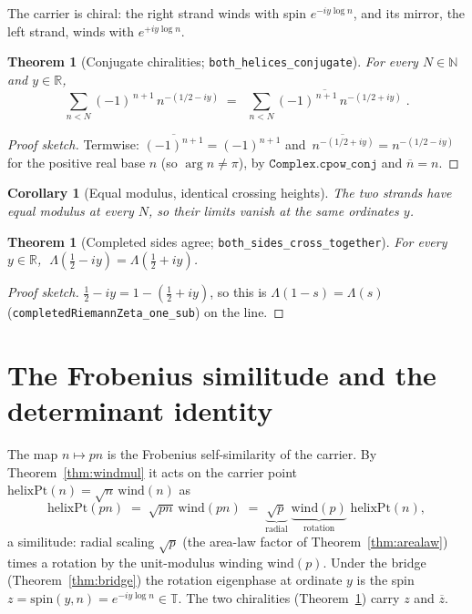 \documentclass[11pt]{article}
\newtheorem{theorem}[definition]{Theorem}
\newtheorem{corollary}[definition]{Corollary}
\DeclareMathOperator{\arglocal}{arg}
\newcommand{\R}{\mathbb{R}}
\newcommand{\N}{\mathbb{N}}
\newcommand{\T}{\mathbb{T}}
\newcommand{\conj}[1]{\overline{#1}}
\newcommand{\code}[1]{\texttt{#1}}
\begin{document}
The carrier is chiral: the right strand winds with spin $e^{-iy\log n}$, and its mirror, the left
strand, winds with $e^{+iy\log n}$.

\begin{theorem}[Conjugate chiralities; \code{both\_helices\_conjugate}]\label{thm:conjhelix}
For every $N\in\N$ and $y\in\R$,
\[
  \sum_{n<N}(-1)^{\,n+1}\,n^{-(1/2-iy)}
   \;=\; \conj{\;\sum_{n<N}(-1)^{\,n+1}\,n^{-(1/2+iy)}\;}.
\]
\end{theorem}

\begin{proof}[Proof sketch]
Termwise: $\conj{(-1)^{n+1}}=(-1)^{n+1}$ and $\conj{\,n^{-(1/2+iy)}}=n^{-(1/2-iy)}$ for the positive
real base $n$ (so $\arglocal n\neq\pi$), by $\code{Complex.cpow\_conj}$ and $\conj n=n$.
\end{proof}

\begin{corollary}[Equal modulus, identical crossing heights]\label{cor:equalmod}
The two strands have equal modulus at every $N$, so their limits vanish at the same ordinates $y$.
\end{corollary}

\begin{theorem}[Completed sides agree; \code{both\_sides\_cross\_together}]\label{thm:bothsides}
For every $y\in\R$, $\;\Lambda(\tfrac12-iy)=\Lambda(\tfrac12+iy)$.
\end{theorem}

\begin{proof}[Proof sketch]
$\tfrac12-iy=1-(\tfrac12+iy)$, so this is $\Lambda(1-s)=\Lambda(s)$
(\code{completedRiemannZeta\_one\_sub}) on the line.
\end{proof}

\section{The Frobenius similitude and the determinant identity}\label{sec:det}

The map $n\mapsto pn$ is the Frobenius self-similarity of the carrier. By Theorem~\ref{thm:windmul}
it acts on the carrier point $\mathrm{helixPt}(n)=\sqrt n\,\mathrm{wind}(n)$ as
\[
  \mathrm{helixPt}(pn) \;=\; \sqrt{pn}\,\mathrm{wind}(pn)
   \;=\; \underbrace{\sqrt p}_{\text{radial}}\;\underbrace{\mathrm{wind}(p)}_{\text{rotation}}\;\mathrm{helixPt}(n),
\]
a similitude: radial scaling $\sqrt p$ (the area-law factor of Theorem~\ref{thm:arealaw}) times a
rotation by the unit-modulus winding $\mathrm{wind}(p)$. Under the bridge (Theorem~\ref{thm:bridge})
the rotation eigenphase at ordinate $y$ is the spin $z=\mathrm{spin}(y,n)=e^{-iy\log n}\in\T$. The two
chiralities (Theorem~\ref{thm:conjhelix}) carry $z$ and $\conj z$.
\end{document}

